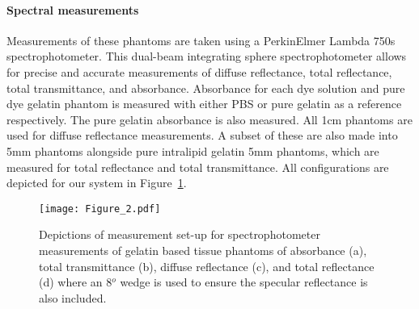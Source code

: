 \paragraph{Spectral measurements}\label{sec:methodsphantommeasure1}
Measurements of these phantoms are taken using a PerkinElmer Lambda 750s spectrophotometer. This dual-beam integrating sphere spectrophotometer allows for precise and accurate measurements of diffuse reflectance, total reflectance, total transmittance, and absorbance. Absorbance for each dye solution and pure dye gelatin phantom is measured with either PBS or pure gelatin as a reference respectively. The pure gelatin absorbance is also measured. 
All 1cm phantoms are used for diffuse reflectance measurements. A subset of these are also made into 5mm phantoms alongside pure intralipid gelatin 5mm phantoms, which are measured for total reflectance and total transmittance. 
All configurations are depicted for our system in Figure~\ref{fig:spectrophotometer}. 
\begin{figure}[t!]
    \centering
    \texttt{[image: Figure\_2.pdf]}
    \caption{Depictions of measurement set-up for spectrophotometer measurements of gelatin based tissue phantoms of absorbance (a), total transmittance (b), diffuse reflectance (c), and total reflectance (d) where an 8$^o$ wedge is used to ensure the specular reflectance is also included.}
    \label{fig:spectrophotometer}
\end{figure}

